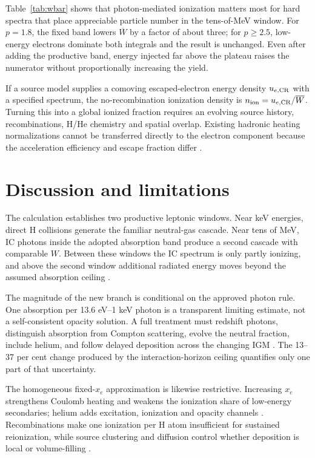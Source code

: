 \documentclass[10pt,twocolumn]{article}
\begin{document}
Table~\ref{tab:wbar} shows that photon-mediated ionization matters most for
hard spectra that place appreciable particle number in the tens-of-MeV window.
For $p=1.8$, the fixed band lowers $\overline W$ by a factor of about three;
for $p\ge2.5$, low-energy electrons dominate both integrals and the result is
unchanged. Even after adding the productive band, energy injected far above
the plateau raises the numerator without proportionally increasing the yield.

If a source model supplies a comoving escaped-electron energy density
$u_{e,\rm CR}$ with a specified spectrum, the no-recombination ionization
density is $n_{\rm ion}=u_{e,\rm CR}/\overline W$. Turning this into a global
ionized fraction requires an evolving source history, recombinations, H/He
chemistry and spatial overlap. Existing hadronic heating normalizations cannot
be transferred directly to the electron component because the acceleration
efficiency and escape fraction differ \citep{Leite2017,Ruszkowski2023}.

\section{Discussion and limitations}

The calculation establishes two productive leptonic windows. Near keV
energies, direct H collisions generate the familiar neutral-gas cascade. Near
tens of MeV, IC photons inside the adopted absorption band produce a second
cascade with comparable $W$. Between these windows the IC spectrum is only
partly ionizing, and above the second window additional radiated energy moves
beyond the assumed absorption ceiling \citep{Blumenthal1970,Slatyer2009}.

The magnitude of the new branch is conditional on the approved photon rule.
One absorption per 13.6 eV--1 keV photon is a transparent limiting estimate,
not a self-consistent opacity solution. A full treatment must redshift photons,
distinguish absorption from Compton scattering, evolve the neutral fraction,
include helium, and follow delayed deposition across the changing IGM
\citep{Kanzaki2008,Slatyer2016}. The 13--37 per cent change produced by the
interaction-horizon ceiling quantifies only one part of that uncertainty.

The homogeneous fixed-$x_e$ approximation is likewise restrictive. Increasing
$x_e$ strengthens Coulomb heating and weakens the ionization share of
low-energy secondaries; helium adds excitation, ionization and opacity channels
\citep{Furlanetto2010}. Recombinations make one ionization per H atom
insufficient for sustained reionization, while source clustering and diffusion
control whether deposition is local or volume-filling
\citep{Robertson2022,Jana2018}.
\end{document}
